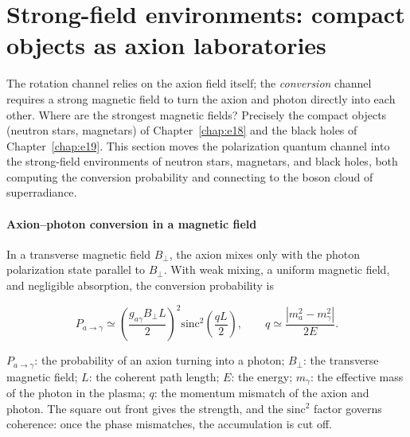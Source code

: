 \section{Strong-field environments: compact objects as axion laboratories}
\label{sec:e22-strongfield}

The rotation channel relies on the axion field itself; the \emph{conversion} channel requires a strong magnetic field to turn the axion and photon directly into each other. Where are the strongest magnetic fields? Precisely the compact objects (neutron stars, magnetars) of Chapter~\ref{chap:e18} and the black holes of Chapter~\ref{chap:e19}. This section moves the polarization quantum channel into the strong-field environments of neutron stars, magnetars, and black holes, both computing the conversion probability and connecting to the boson cloud of superradiance.

\paragraph{Axion--photon conversion in a magnetic field}

In a transverse magnetic field \(B_\perp\), the axion mixes only with the photon polarization state parallel to \(B_\perp\). With weak mixing, a uniform magnetic field, and negligible absorption, the conversion probability is

\begin{equation}
  P_{a\to\gamma}\simeq\left(\frac{g_{a\gamma}B_\perp L}{2}\right)^2
  \mathrm{sinc}^2\!\left(\frac{qL}{2}\right),
  \qquad
  q\simeq\frac{|m_a^2-m_\gamma^2|}{2E}.
  \label{eq:e22-conversion}
\end{equation}
\begin{formulaexplain}
\(P_{a\to\gamma}\): the probability of an axion turning into a photon; \(B_\perp\): the transverse magnetic field; \(L\): the coherent path length; \(E\): the energy; \(m_\gamma\): the effective mass of the photon in the plasma; \(q\): the momentum mismatch of the axion and photon. The square out front gives the strength, and the \(\mathrm{sinc}^2\) factor governs coherence: once the phase mismatches, the accumulation is cut off.
\end{formulaexplain}

